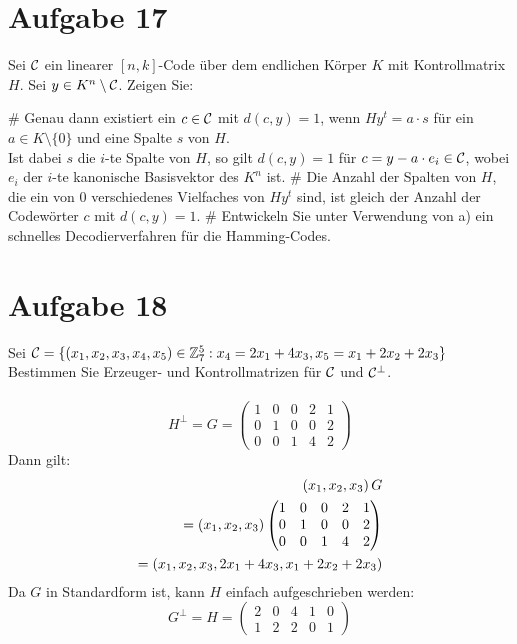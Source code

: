 
\setcounter{MaxMatrixCols}{20}

\section*{Aufgabe 17}
Sei $\mathcal{C}$ ein linearer $[n,k]$-Code über dem endlichen Körper $K$ mit Kontrollmatrix $H$.
Sei $y \in K^n \setminus \mathcal{C}$. Zeigen Sie:
\begin{myList}
#
Genau dann existiert ein $c \in \mathcal{C}$ mit $d(c,y)=1$, wenn $Hy^t = a \cdot s$ für ein $a \in K \setminus \lbrace 0 \rbrace$ und eine Spalte $s$ von $H$.\\
Ist dabei $s$ die $i$-te Spalte von $H$, so gilt $d(c,y) = 1$ für $c = y -a\cdot e_i \in \mathcal{C}$, wobei $e_i$ der $i$-te kanonische Basisvektor des $K^n$ ist.
#
Die Anzahl der Spalten von $H$, die ein von 0 verschiedenes Vielfaches von $Hy^t$ sind, ist gleich der Anzahl der Codewörter $c$ mit $d(c,y) = 1$.
#
Entwickeln Sie unter Verwendung von a) ein schnelles Decodierverfahren für die Hamming-Codes.
\end{myList}
\section*{Aufgabe 18}
Sei $\mathcal{C} = \lbrace (x_1,x_2,x_3,x_4,x_5) \in \mathbb{Z}^5_7 : x_4 = 2x_1 + 4x_3, x_5 = x_1 + 2x_2 + 2x_3 \rbrace$
Bestimmen Sie Erzeuger- und Kontrollmatrizen für $\mathcal{C}$ und $\mathcal{C}^\bot$.\\\\
\begin{equation*}
  H^\bot = G =
  \begin{pmatrix}
  1 & 0 & 0 & 2 & 1 \\
  0 & 1 & 0 & 0 & 2 \\
  0 & 0 & 1 & 4 & 2 
  \end{pmatrix}
\end{equation*}
Dann gilt: 
\begin{align*}
  \left( x_1, x_2, x_3 \right) G\\
= \left( x_1, x_2, x_3 \right)
  \begin{pmatrix}
  1 & 0 & 0 & 2 & 1 \\
  0 & 1 & 0 & 0 & 2 \\
  0 & 0 & 1 & 4 & 2 
  \end{pmatrix}\\
= \left( x_1, x_2, x_3, 2x_1+4x_3, x_1+2x_2+2x_3 \right)
\end{align*}
Da $G$ in Standardform ist, kann $H$ einfach aufgeschrieben werden:
\begin{equation*}
  G^\bot = H = 
  \begin{pmatrix}
  2 & 0 & 4 & 1 & 0 \\
  1 & 2 & 2 & 0 & 1 
  \end{pmatrix}
\end{equation*}
